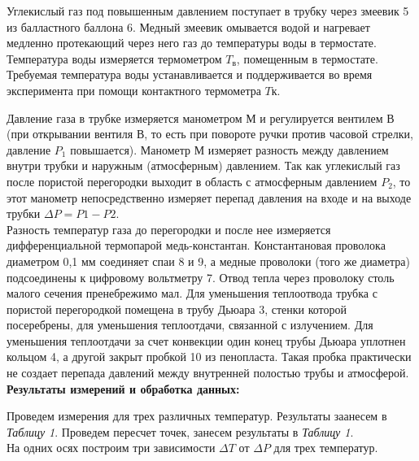 Углекислый газ под повышенным давлением поступает в трубку через змеевик 5 из балластного баллона 6. Медный змеевик омывается водой и нагревает медленно протекающий через него газ до температуры воды в термостате. Температура воды измеряется термометром $T_в$, помещенным в термостате. Требуемая температура воды устанавливается и поддерживается во время эксперимента при помощи контактного термометра $Tк$.

Давление газа в трубке измеряется манометром М и регулируется вентилем В (при открывании вентиля В, то есть  при повороте ручки против часовой стрелки, давление $P_1$ повышается). Манометр М измеряет разность между давлением внутри трубки и наружным (атмосферным) давлением. Так как углекислый газ после пористой перегородки выходит в область с атмосферным давлением $P_2$, то этот манометр непосредственно измеряет перепад давления на входе и на выходе трубки $\Delta P = P1 - P2.$\\

Разность температур газа до перегородки и после нее измеряется дифференциальной термопарой медь-константан. Константановая проволока диаметром 0,1 мм соединяет спаи 8 и 9, а медные проволоки (того же диаметра) подсоединены к цифровому вольтметру 7. Отвод тепла через проволоку столь малого сечения пренебрежимо мал. Для уменьшения теплоотвода трубка с пористой перегородкой помещена в трубу Дьюара 3, стенки которой посеребрены, для уменьшения теплоотдачи, связанной с излучением. Для уменьшения теплоотдачи за счет конвекции один конец трубы Дьюара уплотнен кольцом 4, а другой закрыт пробкой 10 из пенопласта. Такая пробка практически не создает перепада давлений между внутренней полостью трубы и атмосферой.\\


\textbf{Результаты измерений и обработка данных:}

Проведем измерения для трех различных температур. Результаты заанесем в \textit{Таблицу 1}. Проведем пересчет точек, занесем результаты в \textit{Таблицу 1}.\\

На одних осях построим три зависимости $\Delta T$ от $\Delta P$ для трех температур.\\

